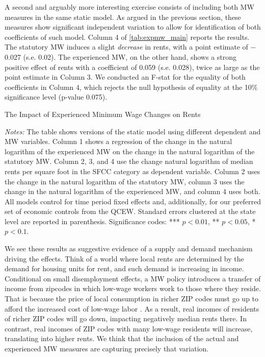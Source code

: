A second and arguably more interesting exercise consists of including both MW measures in
the same static model. As argued in the previous section, these measures show significant
independent variation to allow for identification of both coefficients of such model. 
Column 4 of \autoref{tab:expmw_main} reports the results. The statutory MW induces
a slight \textit{decrease} in rents, with a point estimate of $-$0.027 (s.e. 0.02). The 
experienced MW, on the other hand, shows a strong positive effect of rents with a 
coefficient of 0.059 (s.e. 0.028), twice as large as the point estimate in Column 3. We
conducted an F-stat for the equality of both coefficients in Column 4, which rejects the
null hypothesis of equality at the 10\% significance level (p-value 0.075). 

\begin{table}[htb!]\centering
	\caption{The Impact of Experienced Minimum Wage Changes on Rents}
	\label{tab:expmw_main}
	
	\begin{minipage}{0.95\textwidth}\footnotesize
		\vspace{3mm}	
		\textit{Notes:} The table shows versions of the static model using different 
		dependent and MW variables. Column 1 shows a regression of the change in the natural 
		logarithm of the experienced MW on the change in the natural logarithm of the 
		statutory MW. Column 2, 3, and 4 use the change natural logarithm of median rents per 
		square foot in the SFCC category as dependent variable. Column 2 uses the change in 
		the natural logarithm of the statutory MW, column 3 uses the change in the natural 
		logarithm of the experienced MW, and column 4 uses both. All models control for time 
		period fixed effects and, additionally, for our preferred set of economic controls 
		from the QCEW. 
		Standard errors clustered at the state level are reported in parenthesis. Significance 
		codes: *** $p < 0.01$, ** $p < 0.05$, * $p < 0.1$.
	\end{minipage}
\end{table}

We see these results as suggestive evidence of a supply and demand mechanism driving the 
effects. Think of a world where local rents are determined by the demand for housing units for
rent, and such demand is increasing in income. Conditional on small disemployment effects, a MW
policy introduces a transfer of income from zipcodes in which low-wage workers work to those 
where they reside. That is because the price of local consumption in richer ZIP codes must go 
up to afford the increased cost of low-wage labor \parencite[as exemplified by, e.g., ][]
{allegretto2018local}. As a result, real incomes of residents of richer ZIP codes will go down, 
impacting negatively median rents there. In contrast, real incomes of ZIP codes with many 
low-wage residents will increase, translating into higher rents. We think that the inclusion 
of the actual and experienced MW measures are capturing precisely that variation.
